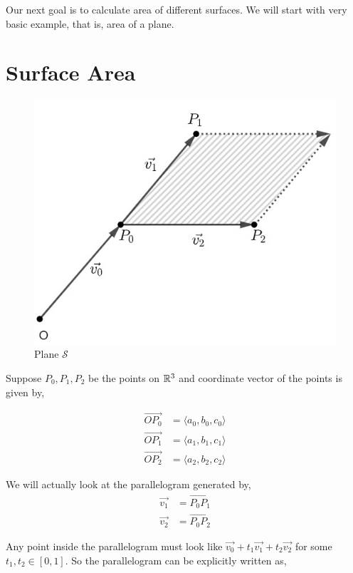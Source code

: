 \documentclass[../Analysis-3]{subfiles}
\begin{document}
Our next goal is to calculate area of different surfaces. We will start with very basic example, that is, area of a plane.

\vfill

\pagebreak

\section{Surface Area} \label{marker}

\begin{figure}
    \centering
    \includegraphics[width=.78\linewidth]{../figures/lec-25.1.png}
    \caption{Plane $\mathcal{S}$}
\end{figure}

Suppose $P_0,P_1,P_2$ be the points on $\mathbb{R}^3$ and coordinate vector of the points is given by,

\begin{align*}
    \overrightarrow{OP_0} & = \langle a_0,b_0,c_0 \rangle \\
    \overrightarrow{OP_1} & = \langle a_1,b_1,c_1 \rangle \\
    \overrightarrow{OP_2} & = \langle a_2,b_2,c_2 \rangle
\end{align*}

We will actually look at the parallelogram generated by,
\begin{align*}
    \vec{v_1} & = \overrightarrow{P_0P_1} \\
    \vec{v_2} & = \overrightarrow{P_0P_2}
\end{align*}

Any point inside the parallelogram must look like $\vec{v_0} + t_1 \vec{v_1} +t_2 \vec{v_2}$ for some $t_1,t_2 \in [0,1]$. So the parallelogram can be explicitly written as,
\end{document}
